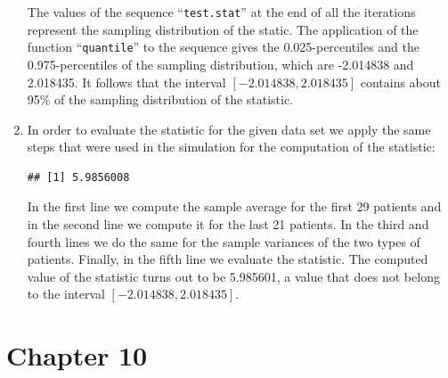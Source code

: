 \documentclass[]{krantz}
\makeatletter
\newenvironment{Shaded}{\begin{snugshade}}{\end{snugshade}}
\newcommand{\KeywordTok}[1]{\textcolor[rgb]{0.13,0.29,0.53}{\textbf{#1}}}
\newcommand{\DecValTok}[1]{\textcolor[rgb]{0.00,0.00,0.81}{#1}}
\newcommand{\StringTok}[1]{\textcolor[rgb]{0.31,0.60,0.02}{#1}}
\newcommand{\OperatorTok}[1]{\textcolor[rgb]{0.81,0.36,0.00}{\textbf{#1}}}
\newcommand{\NormalTok}[1]{#1}
\newenvironment{kframe}{%
\medskip{}
\setlength{\fboxsep}{.8em}
 \def\at@end@of@kframe{}%
 \ifinner\ifhmode%
  \def\at@end@of@kframe{\end{minipage}}%
  \begin{minipage}{\columnwidth}%
 \fi\fi%
 \def\FrameCommand##1{\hskip\@totalleftmargin \hskip-\fboxsep
 \colorbox{shadecolor}{##1}\hskip-\fboxsep
     \hskip-\linewidth \hskip-\@totalleftmargin \hskip\columnwidth}%
 \MakeFramed {\advance\hsize-\width
   \@totalleftmargin\z@ \linewidth\hsize
   \@setminipage}}%
 {\par\unskip\endMakeFramed%
 \at@end@of@kframe}
\renewenvironment{Shaded}{\begin{kframe}}{\end{kframe}}
\theoremstyle{definition}
\theoremstyle{definition}
\theoremstyle{definition}
\theoremstyle{remark}
\makeatother
\begin{document}
\begin{enumerate}
  The values of the sequence ``\texttt{test.stat}'' at the end of all
  the iterations represent the sampling distribution of the static. The
  application of the function ``\texttt{quantile}'' to the sequence
  gives the 0.025-percentiles and the 0.975-percentiles of the sampling
  distribution, which are -2.014838 and 2.018435. It follows that the
  interval \([-2.014838, 2.018435]\) contains about 95\% of the sampling
  distribution of the statistic.
\item
  In order to evaluate the statistic for the given data set we apply the
  same steps that were used in the simulation for the computation of the
  statistic:

\begin{Shaded}
\end{Shaded}

\begin{verbatim}
## [1] 5.9856008
\end{verbatim}

  In the first line we compute the sample average for the first 29
  patients and in the second line we compute it for the last 21
  patients. In the third and fourth lines we do the same for the sample
  variances of the two types of patients. Finally, in the fifth line we
  evaluate the statistic. The computed value of the statistic turns out
  to be 5.985601, a value that does not belong to the interval
  \([-2.014838, 2.018435]\).
\end{enumerate}

\section*{Chapter 10}\label{chapter-10}
\end{document}
